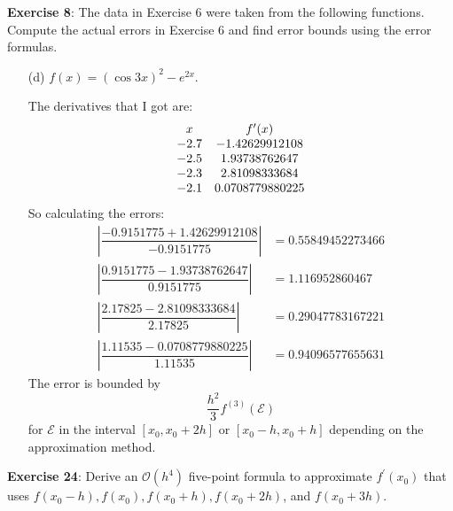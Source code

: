 \documentclass{article}
\begin{document}
\textbf{Exercise 8}: The data in Exercise $6$ were taken from the following functions. Compute the actual errors in Exercise $6$ and find error bounds using the error formulas.
    \begin{itemize}
        \item [(d)] $f(x) = (\cos{3x})^{2} - e^{2x}$.
            \begin{answer}
                The derivatives that I got are: 
                    \begin{align*}
                        \begin{array}{ c c }
                            x    & f^{\prime}(x)   \\
                            -2.7 & -1.42629912108  \\
                            -2.5 & 1.93738762647   \\
                            -2.3 & 2.81098333684   \\
                            -2.1 & 0.0708779880225   
                        \end{array}
                    \end{align*}
                So calculating the errors:
                    \begin{align*}
                        \left\lvert \dfrac{-0.9151775 + 1.42629912108}{-0.9151775} \right\rvert &= 0.55849452273466 \\
                        \left\lvert \dfrac{0.9151775 - 1.93738762647}{0.9151775} \right\rvert   &= 1.116952860467   \\
                        \left\lvert \dfrac{2.17825 - 2.81098333684}{2.17825} \right\rvert       &= 0.29047783167221 \\
                        \left\lvert \dfrac{1.11535 - 0.0708779880225}{1.11535} \right\rvert     &= 0.94096577655631   
                    \end{align*}
                The error is bounded by
                    \begin{equation*}
                        \dfrac{h^{2}}{3} f^{(3)}(\mathcal{E})
                    \end{equation*}
                for $\mathcal{E}$ in the interval $[x_{0}, x_{0} + 2h]$ or $[x_{0} - h, x_{0} + h]$ depending on the approximation method.
            \end{answer}
    \end{itemize}

\textbf{Exercise 24}: Derive an $\mathcal{O}(h^{4})$ five-point formula to approximate $f^{\prime}(x_{0})$ that uses $f(x_{0} - h), f(x_{0}), f(x_{0} + h), f(x_{0} + 2h)$, and $f(x_{0} + 3h)$.
    \begin{answer}
        
    \end{answer}
\end{document}
